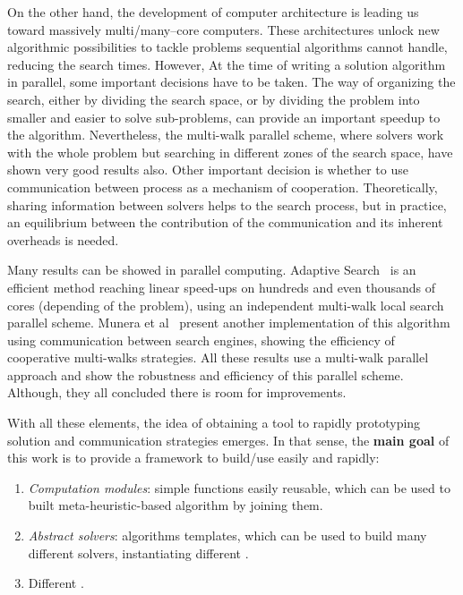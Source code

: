 On the other hand, the development of computer architecture is leading us toward massively multi/many--core computers. These architectures unlock new algorithmic possibilities to tackle problems sequential algorithms cannot handle, reducing the search times.  However,  At the time of writing a solution algorithm in parallel, some important decisions have to be taken. The way of organizing the search, either by dividing the search space, or by dividing the problem into smaller and easier to solve sub-problems, can provide an important speedup to the algorithm. Nevertheless, the multi-walk parallel scheme, where solvers work with the whole problem but searching in different zones of the search space, have shown very good results also. Other important decision is whether to use communication between process as a mechanism of cooperation. Theoretically, sharing information between solvers helps to the search process, but in practice, an equilibrium between the contribution of the communication and its inherent overheads is needed.

Many results can be showed in parallel computing. Adaptive Search~\cite{Diaz} is an efficient method reaching linear speed-ups on hundreds and even thousands of cores (depending of the problem), using an independent multi-walk local search parallel scheme. Munera et al~\cite{Munera} present another implementation of this algorithm using communication between search engines, showing the efficiency of cooperative multi-walks strategies. All these results use a multi-walk parallel approach and show the robustness and efficiency of this parallel scheme. Although, they all concluded there is room for improvements. 

With all these elements, the idea of obtaining a tool to rapidly prototyping solution and communication strategies emerges. In that sense, the \textbf{main goal} of this work is to provide a framework to build/use easily and rapidly:
\begin{enumerate}
\item \textit{Computation modules}: simple functions easily reusable, which can be used to built meta-heuristic-based algorithm by joining them.
\item \textit{Abstract solvers}: algorithms templates, which can be used to build many different solvers, instantiating different \oms.
\item Different \comstrs.
\end{enumerate} 

